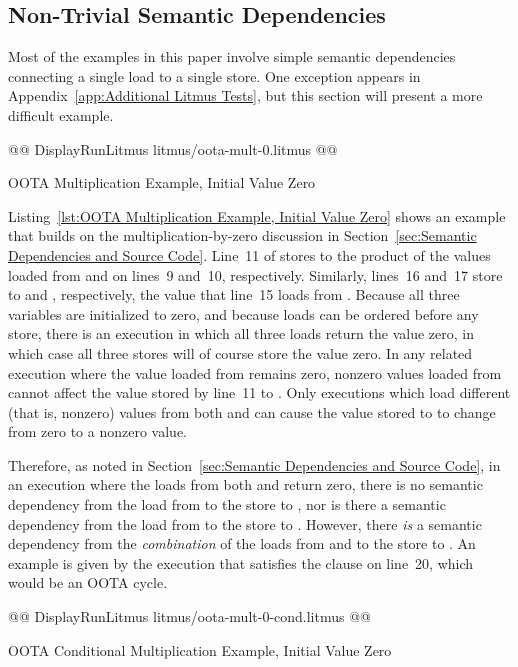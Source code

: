 \documentclass[10]{article}
\begin{document}
\subsection{Non-Trivial Semantic Dependencies}
\label{app:Non-Trivial Semantic Dependencies}

Most of the examples in this paper involve simple semantic dependencies
connecting a single load to a single store.
One exception appears in
Appendix~\ref{app:Additional Litmus Tests},
but this section will present a more difficult example.

\begin{listing}[tbp]
@@ DisplayRunLitmus litmus/oota-mult-0.litmus @@
\caption{OOTA Multiplication Example, Initial Value Zero}
\label{lst:OOTA Multiplication Example, Initial Value Zero}
\end{listing}

Listing~\ref{lst:OOTA Multiplication Example, Initial Value Zero}
shows an example that builds on the multiplication-by-zero
discussion in
Section~\ref{sec:Semantic Dependencies and Source Code}.
Line~11 of  stores to  the product of the values loaded from
 and  on lines~9 and~10, respectively.
Similarly, lines~16 and~17 store to  and , respectively,
the value that line~15 loads from .
Because all three variables are initialized to zero, and because loads
can be ordered before any store, there is an execution in which all
three loads return the value zero, in which case all three stores will
of course store the value zero.
In any related execution where the value loaded from  remains zero,
nonzero values loaded from  cannot affect the value stored by
line~11 to .
Only executions which load different (that is, nonzero) values from
both  and  can cause the value stored to  to change
from zero to a nonzero value.

Therefore, as noted in
Section~\ref{sec:Semantic Dependencies and Source Code},
in an execution where the loads from both  and  return zero,
there is no semantic dependency from the load from  to the
store to , nor is there a semantic dependency from the load
from  to the store to .
However, there \emph{is} a semantic dependency from the \emph{combination}
of the loads from  and  to the store to .
An example is given by the execution that satisfies the
 clause on line~20, which would be an OOTA cycle.

\begin{listing}[tbp]
@@ DisplayRunLitmus litmus/oota-mult-0-cond.litmus @@
\caption{OOTA Conditional Multiplication Example, Initial Value Zero}
\label{lst:OOTA Conditional Multiplication Example, Initial Value Zero}
\end{listing}
\end{document}

